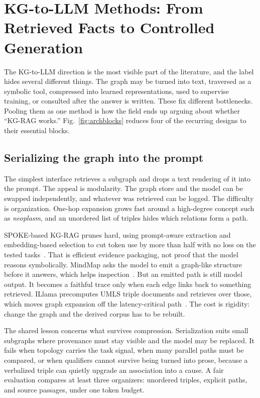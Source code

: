 \section{KG-to-LLM Methods: From Retrieved Facts to Controlled Generation}
\label{sec:kgtollm}

The KG-to-LLM direction is the most visible part of the literature, and the label hides several different things. The graph may be turned into text, traversed as a symbolic tool, compressed into learned representations, used to supervise training, or consulted after the answer is written. These fix different bottlenecks. Pooling them as one method is how the field ends up arguing about whether ``KG-RAG works.'' Fig.~\ref{fig:archblocks} reduces four of the recurring designs to their essential blocks.



\subsection{Serializing the graph into the prompt}

The simplest interface retrieves a subgraph and drops a text rendering of it into the prompt. The appeal is modularity. The graph store and the model can be swapped independently, and whatever was retrieved can be logged. The difficulty is organization. One-hop expansion grows fast around a high-degree concept such as \emph{neoplasm}, and an unordered list of triples hides which relations form a path.

SPOKE-based KG-RAG prunes hard, using prompt-aware extraction and embedding-based selection to cut token use by more than half with no loss on the tested tasks~\cite{soman2024kgrag}. That is efficient evidence packaging, not proof that the model reasons symbolically. MindMap asks the model to emit a graph-like structure before it answers, which helps inspection~\cite{wen2024mindmap}. But an emitted path is still model output. It becomes a faithful trace only when each edge links back to something retrieved. ILlama precomputes UMLS triple documents and retrieves over those, which moves graph expansion off the latency-critical path~\cite{park2025illama}. The cost is rigidity: change the graph and the derived corpus has to be rebuilt.

The shared lesson concerns what survives compression. Serialization suits small subgraphs where provenance must stay visible and the model may be replaced. It fails when topology carries the task signal, when many parallel paths must be compared, or when qualifiers cannot survive being turned into prose, because a verbalized triple can quietly upgrade an association into a cause. A fair evaluation compares at least three organizers: unordered triples, explicit paths, and source passages, under one token budget.

